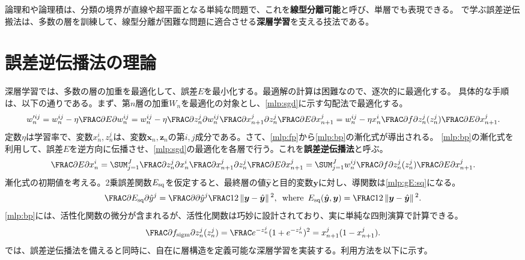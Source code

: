 \documentclass[10pt,a4paper]{book}
\begin{document}
論理和や論理積は、分類の境界が直線や超平面となる単純な問題で、これを\textbf{線型分離可能}と呼び、単層でも表現できる。
で学ぶ誤差逆伝搬法は、多数の層を訓練して、線型分離が困難な問題に適合させる\textbf{深層学習}を支える技法である。

\section{誤差逆伝播法の理論\label{sect:mlp}}

深層学習では、多数の層の加重を最適化して、誤差$E$を最小化する。最適解の計算は困難なので、逐次的に最適化する。
具体的な手順は、以下の通りである。まず、第$n$層の加重$W_n$を最適化の対象とし、\eqref{mlp:sgd}に示す勾配法で最適化する。
%
\begin{equation}
\label{eq:mlp:sgd}
w_n'^{ij}
= w_n^{ij}-\eta \pdiff{E}{w_n^{ij}}
= w_n^{ij}-\eta \pdiff{z_n^j}{w_n^{ij}} \pdiff{x_{n+1}^j}{z_n^j} \pdiff{E}{x_{n+1}^j}
= w_n^{ij}-\eta x_n^i \pdiff{f}{z_n^j}(z_n^j) \pdiff{E}{x_{n+1}^j}.
\end{equation}
%
定数$\eta$は学習率で、変数$x_n^i,z_n^j$は、変数$\bm{x}_n,\bm{z}_n$の第$i,j$成分である。さて、\eqref{mlp:fp}から\eqref{mlp:bp}の漸化式が導出される。
\eqref{mlp:bp}の漸化式を利用して、誤差$E$を逆方向に伝播させ、\eqref{mlp:sgd}の最適化を各層で行う。これを\textbf{誤差逆伝播法}と呼ぶ。
%
\begin{equation}
\label{eq:mlp:bp}
\pdiff{E}{x_n^i}
= \sum_{j=1}^J \pdiff{z_n^j}{x_n^i} \pdiff{x_{n+1}^j}{z_n^j} \pdiff{E}{x_{n+1}^j}
= \sum_{j=1}^J w_n^{ij} \pdiff{f}{z_n^j}(z_n^j) \pdiff{E}{x_{n+1}^j}.
\end{equation}
%
漸化式の初期値を考える。2乗誤差関数$E_\mathrm{sq}$を仮定すると、最終層の値$\hat{\bm{y}}$と目的変数$\bm{y}$に対し、導関数は\eqref{mlp:gE:sq}になる。
%
\begin{equation}
\label{eq:mlp:gE:sq}
\pdiff{\Esq}{\hat{y}^j} = \pdiff{}{\hat{y}^j} \frac{1}{2} \norm{\bm{y}-\hat{\bm{y}}}^2,
\where
\Esq(\hat{\bm{y}},\bm{y}) = \frac{1}{2} \norm{\bm{y}-\hat{\bm{y}}}^2.
\end{equation}
%
\eqref{mlp:bp}には、活性化関数の微分が含まれるが、活性化関数は巧妙に設計されており、実に単純な四則演算で計算できる。
%
\begin{equation}
\label{eq:nn:sigm:d}
\pdiff{\sigm}{z_n^j}(z_n^j) = \frac{e^{-z_n^j}}{(1+e^{-z_n^j})^2} = x_{n+1}^j(1-x_{n+1}^j).
\end{equation}
%
では、誤差逆伝播法を備えると同時に、自在に層構造を定義可能な深層学習を実装する。利用方法を以下に示す。
\end{document}
